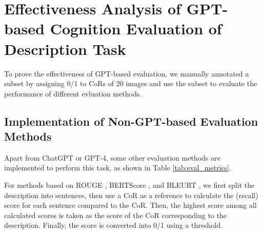 

\section{Effectiveness Analysis of GPT-based Cognition Evaluation of Description Task}
\label{sec:eval_gpt_eval}


To prove the effectiveness of GPT-based evaluation, we manually annotated a subset by assigning 0/1 to CoRs of 20 images and use the subset to evaluate the performance of different evluation methods.

\subsection{Implementation of Non-GPT-based Evaluation Methods}
Apart from ChatGPT or GPT-4, some other evaluation methods are implemented to perform this task, as shown in Table \ref{tab:eval_metrics}.

For methods based on ROUGE \cite{lin2004rouge}, BERTScore \cite{bertscore}, and BLEURT \cite{sellam2020bleurt},
we first split the description into sentences, then use a CoR as a reference to calculate the (recall) score for each sentence compared to the CoR. 
Then, the highest score among all calculated scores is taken as the score of the CoR corresponding to the description.
Finally, the score is converted into 0/1 using a threshold. 

